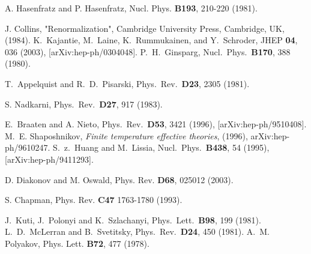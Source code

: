 \begin{thebibliography}{10}
A. Hasenfratz and P. Hasenfratz, Nucl. Phys. {\bf B193}, 210-220 (1981).

J. Collins, "Renormalization", Cambridge University Press, Cambridge, UK, (1984).
K.~Kajantie, M.~Laine, K.~Rummukainen, and Y.~Schroder,
\newblock JHEP {\bf 04}, 036 (2003), [arXiv:hep-ph/0304048].
  P.~H.~Ginsparg,
  Nucl.\ Phys.\ {\bf B170}, 388 (1980).

  T.~Appelquist and R.~D.~Pisarski,
  Phys.\ Rev.\ {\bf D23}, 2305 (1981).

  S. Nadkarni,
  Phys.\ Rev.\ {\bf D27}, 917 (1983).

  E.~Braaten and A. Nieto,
  Phys.\ Rev.\ {\bf D53}, 3421 (1996),
  [arXiv:hep-ph/9510408].
M.~E. Shaposhnikov, {\it Finite temperature effective theories},
\newblock (1996), arXiv:hep-ph/9610247.%
  S.~z.~Huang and M.~Lissia,
  Nucl.\ Phys.\ {\bf B438}, 54 (1995),
  [arXiv:hep-ph/9411293].

D. Diakonov and M. Oswald, Phys. Rev. {\bf D68}, 025012 (2003).

S. Chapman, Phys. Rev. {\bf C47} 1763-1780 (1993).

  J.~Kuti, J.~Polonyi and K.~Szlachanyi,
  Phys.\ Lett.\ {\bf B98}, 199 (1981).
  L.~D.~McLerran and B.~Svetitsky,
  Phys.\ Rev.\ {\bf D24}, 450 (1981).
A.~M. Polyakov,
\newblock Phys. Lett. {\bf B72}, 477 (1978).


\end{thebibliography}
